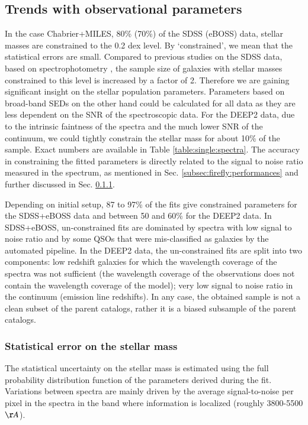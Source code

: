 \documentclass[onecolumn]{aa}
\begin{document}
\subsection{Trends with observational parameters}
\label{subsec:about:convergence}
In the case Chabrier+MILES, 80\% (70\%) of the SDSS (eBOSS) data, stellar masses are constrained to the 0.2 dex level. 
By `constrained', we mean that the statistical errors are small. 
Compared to previous studies on the SDSS data, based on spectrophotometry \citep[e.g.][]{Maraston2013}, the sample size of galaxies with stellar masses constrained to this level is increased by a factor of 2. 
Therefore we are gaining significant insight on the stellar population parameters. 
Parameters based on broad-band SEDs on the other hand could be calculated for all data as they are less dependent on the SNR of the spectroscopic data. 
For the DEEP2 data, due to the intrinsic faintness of the spectra and the much lower SNR of the continuum, we could tightly constrain the stellar mass for about 10\% of the sample.
Exact numbers are available in Table \ref{table:single:spectra}. 
The accuracy in constraining the fitted parameters is directly related to the signal to noise ratio measured in the spectrum, as mentioned in Sec. \ref{subsec:firefly:performances} and further discussed in Sec. \ref{subsec:stat:err}. 

Depending on initial setup, 87 to 97\% of the fits give constrained parameters for the SDSS+eBOSS data and between 50 and 60\% for the DEEP2 data. 
In SDSS+eBOSS, un-constrained fits are dominated by spectra with low signal to noise ratio and by some QSOs that were mis-classified as galaxies by the automated pipeline. %
In the DEEP2 data, the un-constrained fits are split into two components: low redshift galaxies for which the wavelength coverage of the spectra was not sufficient (the wavelength coverage of the observations does not contain the wavelength coverage of the model); very low signal to noise ratio in the continuum (emission line redshifts). 
In any case, the obtained sample is not a clean subset of the parent catalogs, rather it is a biased subsample of the parent catalogs.

\subsubsection{Statistical error on the stellar mass}
\label{subsec:stat:err}
The statistical uncertainty on the stellar mass is estimated using the full probability distribution function of the parameters derived during the fit. 
Variations between spectra are mainly driven by the average signal-to-noise per pixel in the spectra in the band where information is localized (roughly 3800-5500$\AA$). 
\end{document}
